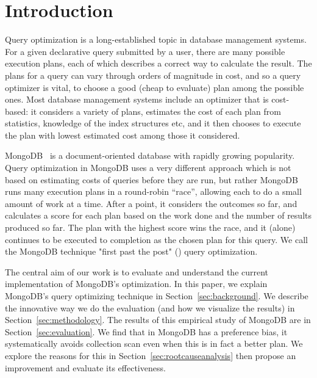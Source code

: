 \section{Introduction}
Query optimization is a long-established topic in database management systems. For a given declarative query submitted by a user, there are many possible execution plans, each of which describes a correct way to calculate the result. The plans for a query can vary through orders of magnitude in cost, and so a query optimizer is vital, to choose a good (cheap to evaluate) plan among the possible ones. Most database management systems include an optimizer that is cost-based: it considers a variety of plans, estimates the cost of each plan from statistics, knowledge of the index structures etc, and it then chooses to execute the plan with lowest estimated cost among those it considered. 

MongoDB~\cite{mongodb_2019} is a document-oriented database with rapidly growing popularity. Query optimization in MongoDB uses a very different approach which is not based on estimating costs of queries before they are run, but rather MongoDB runs many execution plans in a round-robin ``race'', allowing each to do a small amount of work at a time. After a point, it considers the outcomes so far, and calculates a score for each plan based on the work done and the number of results produced so far. The plan with the highest score wins the race, and it (alone) continues to be executed to completion as the chosen plan for this query.
We call the MongoDB technique "first past the post" (\approachName) query optimization.  

The central aim of our work is to evaluate and understand the current implementation of MongoDB's \approachName optimization. 
In this paper, 
we explain MongoDB's query optimizing technique in Section~\ref{sec:background}. We describe the innovative way we do the evaluation (and how we visualize the results) in Section~\ref{sec:methodology}.
The results of this empirical study of MongoDB are in Section~\ref{sec:evaluation}. We find that \approachName in MongoDB has a preference bias, it systematically avoids collection scan even when this is in fact a better plan. We explore the reasons for this in Section~\ref{sec:rootcauseanalysis} then propose an improvement and evaluate its effectiveness.

